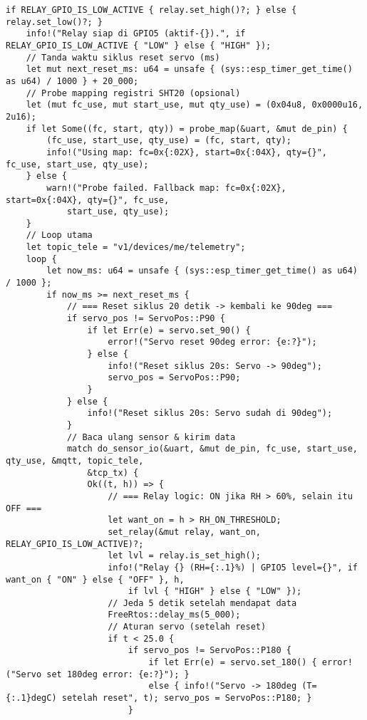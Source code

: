\documentclass[a4paper, 12pt]{article}
\begin{document}
\begin{lstlisting}[style=ruststyle, caption={main.rs}, basicstyle=\ttfamily\tiny]
    if RELAY_GPIO_IS_LOW_ACTIVE { relay.set_high()?; } else { relay.set_low()?; }
    info!("Relay siap di GPIO5 (aktif-{}).", if RELAY_GPIO_IS_LOW_ACTIVE { "LOW" } else { "HIGH" });
    // Tanda waktu siklus reset servo (ms)
    let mut next_reset_ms: u64 = unsafe { (sys::esp_timer_get_time() as u64) / 1000 } + 20_000;
    // Probe mapping registri SHT20 (opsional)
    let (mut fc_use, mut start_use, mut qty_use) = (0x04u8, 0x0000u16, 2u16);
    if let Some((fc, start, qty)) = probe_map(&uart, &mut de_pin) {
        (fc_use, start_use, qty_use) = (fc, start, qty);
        info!("Using map: fc=0x{:02X}, start=0x{:04X}, qty={}", fc_use, start_use, qty_use);
    } else {
        warn!("Probe failed. Fallback map: fc=0x{:02X}, start=0x{:04X}, qty={}", fc_use,
            start_use, qty_use);
    }
    // Loop utama
    let topic_tele = "v1/devices/me/telemetry";
    loop {
        let now_ms: u64 = unsafe { (sys::esp_timer_get_time() as u64) / 1000 };
        if now_ms >= next_reset_ms {
            // === Reset siklus 20 detik -> kembali ke 90deg ===
            if servo_pos != ServoPos::P90 {
                if let Err(e) = servo.set_90() {
                    error!("Servo reset 90deg error: {e:?}");
                } else {
                    info!("Reset siklus 20s: Servo -> 90deg");
                    servo_pos = ServoPos::P90;
                }
            } else {
                info!("Reset siklus 20s: Servo sudah di 90deg");
            }
            // Baca ulang sensor & kirim data
            match do_sensor_io(&uart, &mut de_pin, fc_use, start_use, qty_use, &mqtt, topic_tele,
                &tcp_tx) {
                Ok((t, h)) => {
                    // === Relay logic: ON jika RH > 60%, selain itu OFF ===
                    let want_on = h > RH_ON_THRESHOLD;
                    set_relay(&mut relay, want_on, RELAY_GPIO_IS_LOW_ACTIVE)?;
                    let lvl = relay.is_set_high();
                    info!("Relay {} (RH={:.1}%) | GPIO5 level={}", if want_on { "ON" } else { "OFF" }, h,
                        if lvl { "HIGH" } else { "LOW" });
                    // Jeda 5 detik setelah mendapat data
                    FreeRtos::delay_ms(5_000);
                    // Aturan servo (setelah reset)
                    if t < 25.0 {
                        if servo_pos != ServoPos::P180 {
                            if let Err(e) = servo.set_180() { error!("Servo set 180deg error: {e:?}"); }
                            else { info!("Servo -> 180deg (T={:.1}degC) setelah reset", t); servo_pos = ServoPos::P180; }
                        }

\end{lstlisting}
\end{document}
